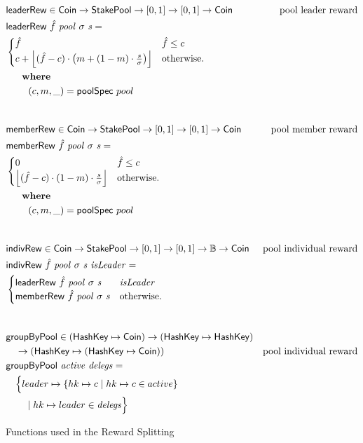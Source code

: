 \begin{figure}[htb]
  \begin{align*}
      & \fun{leaderRew} \in \Coin \to \StakePool \to [0, 1] \to [0, 1] \to \Coin
      & \text{pool leader reward} \\
      & \fun{leaderRew}~\hat{f}~\var{pool}~\sigma~\var{s} = \\
      & \begin{cases}
          \hat{f} & \hat{f} \leq c\\
          c + \floor*{(\hat{f} - c)\cdot\left(m + (1-m)\cdot\frac{s}{\sigma}\right) }&
          \text{otherwise.}
        \end{cases} \\
      & ~~~\where \\
      & ~~~~~~~(c, m, \_) = \fun{poolSpec}~pool \\
      \nextdef
      & \fun{memberRew} \in \Coin \to \StakePool \to [0, 1] \to [0, 1] \to \Coin
      & \text{pool member reward} \\
      & \fun{memberRew}~\hat{f}~\var{pool}~\sigma~\var{s} = \\
      & \begin{cases}
          0 & \hat{f} \leq c\\
          \floor*{(\hat{f} - c)\cdot(1-m)\cdot\frac{s}{\sigma}} &
          \text{otherwise.}
        \end{cases} \\
      & ~~~\where \\
      & ~~~~~~~(c, m, \_) = \fun{poolSpec}~pool \\
      \nextdef
      & \fun{indivRew} \in \Coin \to \StakePool \to [0, 1] \to [0, 1] \to \mathbb{B} \to \Coin
      & \text{pool individual reward} \\
      & \fun{indivRew}~\hat{f}~\var{pool}~\sigma~\var{s}~\var{isLeader} = \\
      & \begin{cases}
          \fun{leaderRew}~\hat{f}~\var{pool}~\sigma~\var{s} & \var{isLeader} \\
        \fun{memberRew}~\hat{f}~\var{pool}~\sigma~\var{s} & \text{otherwise.}
        \end{cases} \\
      \nextdef
      & \fun{groupByPool} \in (\HashKey \mapsto \Coin) \to (\HashKey \mapsto \HashKey) \\
      & ~~~\to
        \left(
        \HashKey \mapsto
        \left(
        \HashKey \mapsto \Coin
        \right)
        \right)
      & \text{pool individual reward} \\
      & \fun{groupByPool}~\var{active}~\var{delegs} = \\
      & ~~~\Big\{ leader \mapsto
      \{hk \mapsto c \mid hk \mapsto c \in active\} \\
      & ~~~~~~            \mid hk \mapsto leader\in\var{delegs} \Big\}
  \end{align*}
  \caption{Functions used in the Reward Splitting}
  \label{fig:functions:reward-splitting}
\end{figure}


